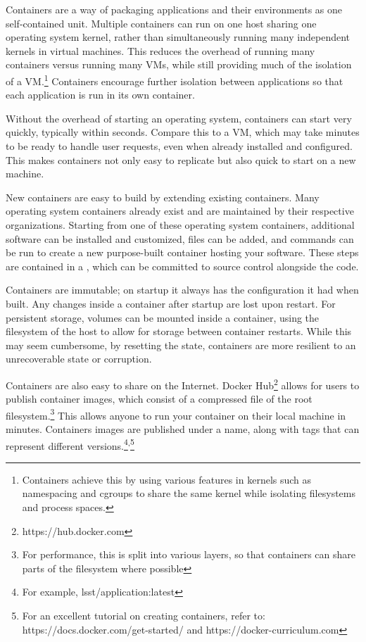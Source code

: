 \documentclass[11pt,twoside]{article}
\begin{document}
Containers are a way of packaging applications and their environments as one self-contained unit.
Multiple containers can run on one host sharing one operating system kernel, rather than simultaneously
running many independent kernels in virtual machines.  This reduces the overhead of running many containers
versus running many VMs, while still providing much of the isolation of a VM.\footnote{Containers
achieve this by using various features in kernels such as namespacing and cgroups
to share the same kernel while isolating filesystems and process spaces.}  Containers
encourage further isolation between applications so that each application is run in its
own container.

Without the overhead of starting an operating system, containers can start very quickly,
typically within seconds.  Compare this to a VM, which may take minutes to be ready to handle
user requests, even when already installed and configured. This makes containers not only
easy to replicate but also quick to start on a new machine.

New containers are easy to build by extending existing containers.  Many operating
system containers already exist and are maintained by their respective organizations.
Starting from one of these operating system containers, additional software can be
installed and customized, files can be added, and commands can be run to create a
new purpose-built container hosting your software.  These steps are contained in a
, which can be committed to source control alongside the code.

Containers are immutable; on startup it always has the configuration it had when built.
Any changes inside a container after startup are lost upon restart.  For persistent storage,
volumes can be mounted inside a container, using the filesystem of the host
to allow for storage between container restarts.  While this may seem cumbersome,
by resetting the state, containers are more resilient to an unrecoverable state or corruption.

Containers are also easy to share on the Internet.  Docker Hub\footnote{https://hub.docker.com}
allows for users to publish container images, which consist of
a compressed  file of the root filesystem.\footnote{For performance, this is split into
various layers, so that containers can share parts of the filesystem where possible} This allows
anyone to run your container on their local machine in minutes.  Containers images are published under
a name, along with tags that can represent different versions.\footnote{For example, lsst/application:latest}\textsuperscript{,}\footnote{
For an excellent tutorial on creating containers, refer to: https://docs.docker.com/get-started/
and https://docker-curriculum.com}
\end{document}
